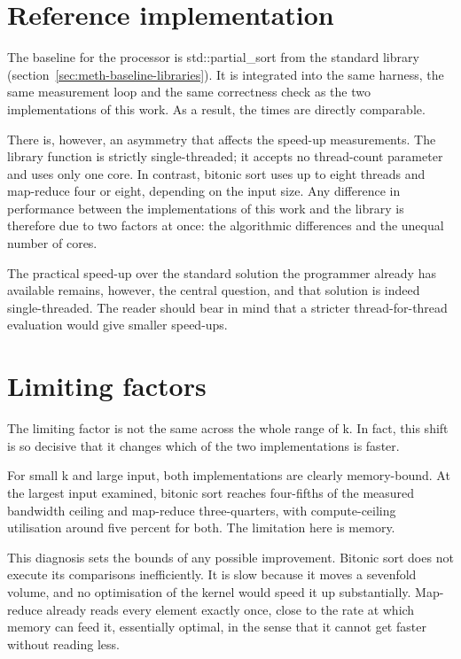 \section{Reference implementation}
\label{sec:cpu-reference}

The baseline for the processor is std::partial\_sort from the standard library
(section~\ref{sec:meth-baseline-libraries}). It is integrated into the same
harness, the same measurement loop and the same correctness check as the two
implementations of this work. As a result, the times are directly comparable.

There is, however, an asymmetry that affects the speed-up measurements. The
library function is strictly single-threaded; it accepts no thread-count
parameter and uses only one core. In contrast, bitonic sort uses up to eight
threads and map-reduce four or eight, depending on the input size. Any
difference in performance between the implementations of this work and the
library is therefore due to two factors at once: the algorithmic differences
and the unequal number of cores.

The practical speed-up over the standard solution the programmer already has
available remains, however, the central question, and that solution is indeed
single-threaded. The reader should bear in mind that a stricter
thread-for-thread evaluation would give smaller speed-ups.

\section{Limiting factors}
\label{sec:cpu-bottlenecks}

The limiting factor is not the same across the whole range of k. In fact, this
shift is so decisive that it changes which of the two implementations is
faster.

For small k and large input, both implementations are clearly memory-bound. At
the largest input examined, bitonic sort reaches four-fifths of the measured
bandwidth ceiling and map-reduce three-quarters, with compute-ceiling
utilisation around five percent for both. The limitation here is memory.

This diagnosis sets the bounds of any possible improvement. Bitonic sort does
not execute its comparisons inefficiently. It is slow because it moves a
sevenfold volume, and no optimisation of the kernel would speed it up
substantially. Map-reduce already reads every element exactly once, close to
the rate at which memory can feed it, essentially optimal, in the sense that it
cannot get faster without reading less.

